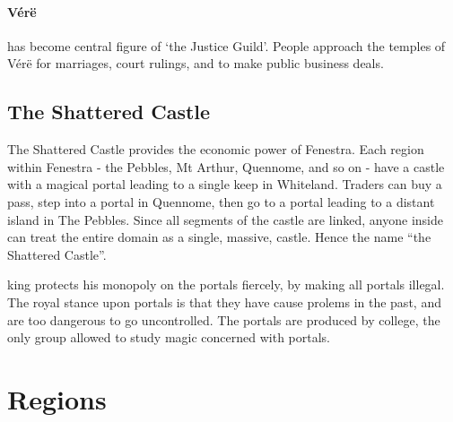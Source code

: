 \begin{multicols}{2}
\paragraph{V\'{e}r\"{e}} has become central figure of `the Justice Guild'.
People approach the temples of V\'{e}r\"{e} for marriages, court rulings, and to make public business deals.

\subsection{The Shattered Castle}

The Shattered Castle provides the economic power of Fenestra.
Each region within Fenestra - the Pebbles, Mt Arthur, Quennome, and so on - have a castle with a magical portal leading to a single keep in Whiteland.
Traders can buy a pass, step into a portal in Quennome, then go to a portal leading to a distant island in The Pebbles.
Since all segments of the castle are linked, anyone inside can treat the entire domain as a single, massive, castle.
Hence the name ``the Shattered Castle''.

\Gls{king} protects his monopoly on the portals fiercely, by making all portals illegal.
The royal stance upon portals is that they have cause prolems in the past, and are too dangerous to go uncontrolled.
The portals are produced by \gls{college}, the only group allowed to study magic concerned with portals.

\end{multicols}

\section{Regions}\label{encounters}

